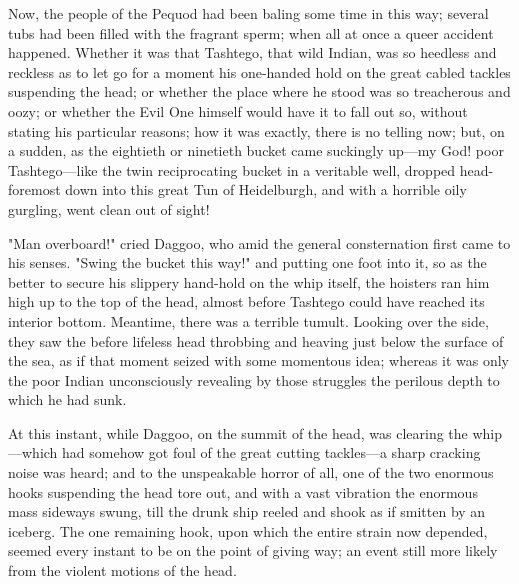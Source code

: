 \documentclass{article}
\begin{document}
Now, the people of the Pequod had been baling some time in this way; several tubs had been filled with the fragrant sperm; when all at once a queer accident happened. Whether it was that Tashtego, that wild Indian, was so heedless and reckless as to let go for a moment his one-handed hold on the great cabled tackles suspending the head; or whether the place where he stood was so treacherous and oozy; or whether the Evil One himself would have it to fall out so, without stating his particular reasons; how it was exactly, there is no telling now; but, on a sudden, as the eightieth or ninetieth bucket came suckingly up—my God! poor Tashtego—like the twin reciprocating bucket in a veritable well, dropped head-foremost down into this great Tun of Heidelburgh, and with a horrible oily gurgling, went clean out of sight!

"Man overboard!" cried Daggoo, who amid the general consternation first came to his senses. "Swing the bucket this way!" and putting one foot into it, so as the better to secure his slippery hand-hold on the whip itself, the hoisters ran him high up to the top of the head, almost before Tashtego could have reached its interior bottom. Meantime, there was a terrible tumult. Looking over the side, they saw the before lifeless head throbbing and heaving just below the surface of the sea, as if that moment seized with some momentous idea; whereas it was only the poor Indian unconsciously revealing by those struggles the perilous depth to which he had sunk.

At this instant, while Daggoo, on the summit of the head, was clearing the whip—which had somehow got foul of the great cutting tackles—a sharp cracking noise was heard; and to the unspeakable horror of all, one of the two enormous hooks suspending the head tore out, and with a vast vibration the enormous mass sideways swung, till the drunk ship reeled and shook as if smitten by an iceberg. The one remaining hook, upon which the entire strain now depended, seemed every instant to be on the point of giving way; an event still more likely from the violent motions of the head.
\end{document}
